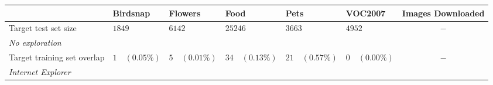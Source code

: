 \newcommand{\blue}[1]{\textcolor{Cerulean}{#1}}
\begin{table}[t]
    \centering
        \begin{adjustbox}{width=1\textwidth}
        \begin{tabular}{
            lr@{\hskip 0.12em}
            rr@{\hskip 0.12em}
            rr@{\hskip 0.12em}
            rr@{\hskip 0.12em}
            rr@{\hskip 0.12em}
            rc}
        \toprule
            &
            \multicolumn{2}{l}{Birdsnap} & 
            \multicolumn{2}{l}{Flowers} & 
            \multicolumn{2}{l}{Food} & 
            \multicolumn{2}{l}{Pets} & 
            \multicolumn{2}{l}{VOC2007} & 
            Images Downloaded \\
        \midrule
        Target test set size                          &  \multicolumn{2}{l}{$1849$} &  \multicolumn{2}{l}{$6142$} & \multicolumn{2}{l}{$25246$} &\multicolumn{2}{l}{$3663$} &\multicolumn{2}{l}{$4952$} & $-$ \\ 
        \midrule
        \textit{No exploration} \\
            \;\;\; Target training set overlap                          &  $1$ & \blue{$(0.05\%)$} &  $5$ & \blue{$(0.01\%)$}& $34$ & \blue{$(0.13\%)$} & $21$ & \blue{$(0.57\%)$} &  $0$ & \blue{$(0.00\%)$} & $-$ \\
        \midrule
        \textit{Internet Explorer} \\

\end{tabular}
\end{adjustbox}
\end{table}
